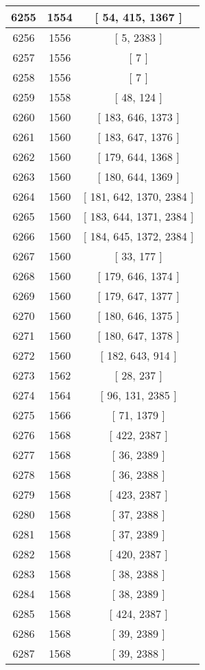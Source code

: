 \begin{center}
\begin{longtable}[H]{|| c c c ||}
\hline
6255 & 1554 & [ 54, 415, 1367 ] \\ 
\hline
6256 & 1556 & [ 5, 2383 ] \\ 
\hline
6257 & 1556 & [ 7 ] \\ 
\hline
6258 & 1556 & [ 7 ] \\ 
\hline
6259 & 1558 & [ 48, 124 ] \\ 
\hline
6260 & 1560 & [ 183, 646, 1373 ] \\ 
\hline
6261 & 1560 & [ 183, 647, 1376 ] \\ 
\hline
6262 & 1560 & [ 179, 644, 1368 ] \\ 
\hline
6263 & 1560 & [ 180, 644, 1369 ] \\ 
\hline
6264 & 1560 & [ 181, 642, 1370, 2384 ] \\ 
\hline
6265 & 1560 & [ 183, 644, 1371, 2384 ] \\ 
\hline
6266 & 1560 & [ 184, 645, 1372, 2384 ] \\ 
\hline
6267 & 1560 & [ 33, 177 ] \\ 
\hline
6268 & 1560 & [ 179, 646, 1374 ] \\ 
\hline
6269 & 1560 & [ 179, 647, 1377 ] \\ 
\hline
6270 & 1560 & [ 180, 646, 1375 ] \\ 
\hline
6271 & 1560 & [ 180, 647, 1378 ] \\ 
\hline
6272 & 1560 & [ 182, 643, 914 ] \\ 
\hline
6273 & 1562 & [ 28, 237 ] \\ 
\hline
6274 & 1564 & [ 96, 131, 2385 ] \\ 
\hline
6275 & 1566 & [ 71, 1379 ] \\ 
\hline
6276 & 1568 & [ 422, 2387 ] \\ 
\hline
6277 & 1568 & [ 36, 2389 ] \\ 
\hline
6278 & 1568 & [ 36, 2388 ] \\ 
\hline
6279 & 1568 & [ 423, 2387 ] \\ 
\hline
6280 & 1568 & [ 37, 2388 ] \\ 
\hline
6281 & 1568 & [ 37, 2389 ] \\ 
\hline
6282 & 1568 & [ 420, 2387 ] \\ 
\hline
6283 & 1568 & [ 38, 2388 ] \\ 
\hline
6284 & 1568 & [ 38, 2389 ] \\ 
\hline
6285 & 1568 & [ 424, 2387 ] \\ 
\hline
6286 & 1568 & [ 39, 2389 ] \\ 
\hline
6287 & 1568 & [ 39, 2388 ] \\ 

\end{longtable}
\end{center}
